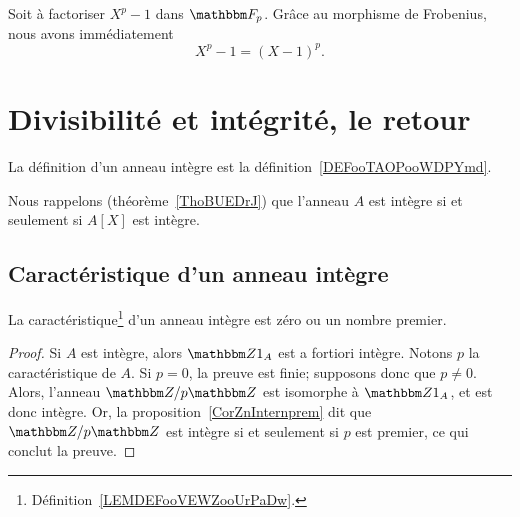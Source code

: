 \begin{example}
    Soit à factoriser \( X^p-1\) dans \( \eF_p\). Grâce au morphisme de Frobenius, nous avons immédiatement
    \begin{equation}
        X^p-1=(X-1)^p.
    \end{equation}
\end{example}

\section{Divisibilité et intégrité, le retour}
\label{SECAnneauxIntegres}

La définition d'un anneau intègre est la définition~\ref{DEFooTAOPooWDPYmd}.

Nous rappelons (théorème~\ref{ThoBUEDrJ}) que l'anneau \( A\) est intègre si et seulement si \( A[X]\) est intègre.

\subsection{Caractéristique d'un anneau intègre}

\begin{lemma}       \label{LemCaractIntergernbrcartpre}
    La caractéristique\footnote{Définition~\ref{LEMDEFooVEWZooUrPaDw}.} d'un anneau intègre est zéro ou un nombre premier.
\end{lemma}

\begin{proof}
    Si \( A\) est intègre, alors \( \eZ 1_A\) est a fortiori intègre. Notons \( p \) la caractéristique de \( A \). Si \( p = 0 \), la preuve est finie; supposons donc que \( p \neq 0 \). Alors, l'anneau \( \eZ/p\eZ\) est isomorphe à \( \eZ 1_A\), et est donc intègre. Or, la proposition~\ref{CorZnInternprem} dit que \( \eZ/p\eZ\) est intègre si et seulement si \( p\) est premier, ce qui conclut la preuve.
\end{proof}

